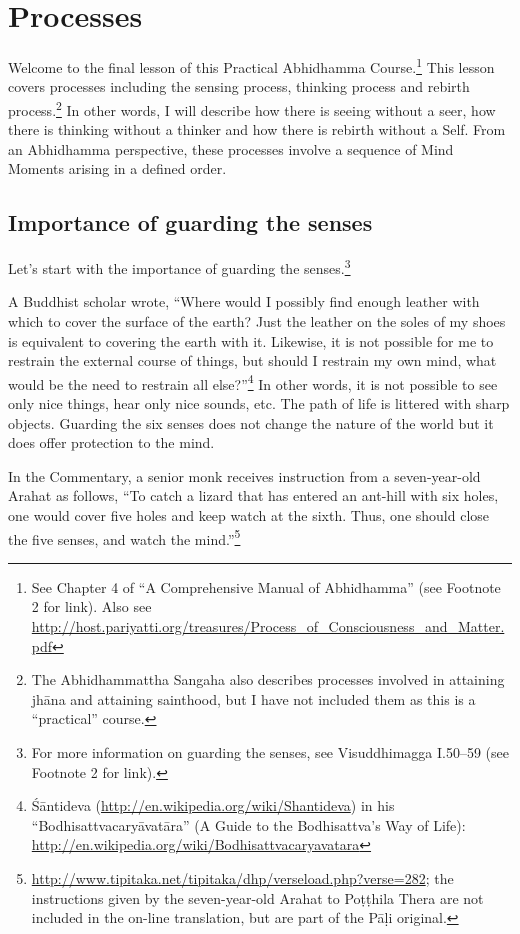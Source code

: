 \section{Processes}

Welcome to the final lesson of this Practical Abhidhamma Course.\footnote{See Chapter 4 of “A Comprehensive Manual of Abhidhamma” (see Footnote 2 for link). \newline Also see \url{http://host.pariyatti.org/treasures/Process_of_Consciousness_and_Matter.pdf}} This lesson covers processes including the sensing process, thinking process and rebirth process.\footnote{The Abhidhammattha Sangaha also describes processes involved in attaining jhāna and attaining sainthood, but I have not included them as this is a “practical” course.} In other words, I will describe how there is seeing without a seer, how there is thinking without a thinker and how there is rebirth without a Self. From an Abhidhamma perspective, these processes involve a sequence of Mind Moments arising in a defined order.

\subsection*{Importance of guarding the senses}

Let's start with the importance of guarding the senses.\footnote{For more information on guarding the senses, see Visuddhimagga I.50--59 (see Footnote 2 for link).}

A Buddhist scholar wrote, “Where would I possibly find enough leather with which to cover the surface of the earth? Just the leather on the soles of my shoes is equivalent to covering the earth with it. Likewise, it is not possible for me to restrain the external course of things, but should I restrain my own mind, what would be the need to restrain all else?”\footnote{Śāntideva (\url{http://en.wikipedia.org/wiki/Shantideva}) in his “Bodhisattvacaryāvatāra” (A Guide to the Bodhisattva’s Way of Life): \url{http://en.wikipedia.org/wiki/Bodhisattvacaryavatara}} In other words, it is not possible to see only nice things, hear only nice sounds, etc. The path of life is littered with sharp objects. Guarding the six senses does not change the nature of the world but it does offer protection to the mind.

In the Commentary, a senior monk receives instruction from a seven-year-old Arahat as follows, “To catch a lizard that has entered an ant-hill with six holes, one would cover five holes and keep watch at the sixth. Thus, one should close the five senses, and watch the mind.”\footnote{\url{http://www.tipitaka.net/tipitaka/dhp/verseload.php?verse=282}; the instructions given by the seven-year-old Arahat to Poṭṭhila Thera are not included in the on-line translation, but are part of the Pāḷi original.}

